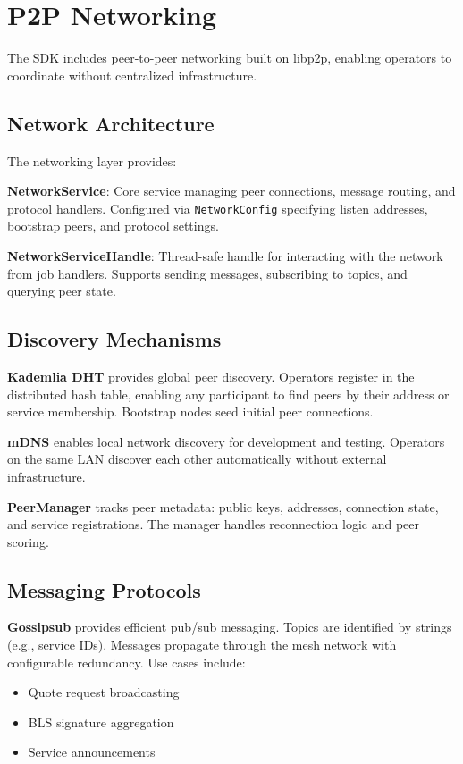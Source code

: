 \documentclass[11pt,a4paper]{article}
\begin{document}
\section{P2P Networking}

The SDK includes peer-to-peer networking built on libp2p, enabling operators to coordinate without centralized infrastructure.

\subsection{Network Architecture}

The networking layer provides:

\textbf{NetworkService}: Core service managing peer connections, message routing, and protocol handlers. Configured via \texttt{NetworkConfig} specifying listen addresses, bootstrap peers, and protocol settings.

\textbf{NetworkServiceHandle}: Thread-safe handle for interacting with the network from job handlers. Supports sending messages, subscribing to topics, and querying peer state.

\subsection{Discovery Mechanisms}

\textbf{Kademlia DHT} provides global peer discovery. Operators register in the distributed hash table, enabling any participant to find peers by their address or service membership. Bootstrap nodes seed initial peer connections.

\textbf{mDNS} enables local network discovery for development and testing. Operators on the same LAN discover each other automatically without external infrastructure.

\textbf{PeerManager} tracks peer metadata: public keys, addresses, connection state, and service registrations. The manager handles reconnection logic and peer scoring.

\subsection{Messaging Protocols}

\textbf{Gossipsub} provides efficient pub/sub messaging. Topics are identified by strings (e.g., service IDs). Messages propagate through the mesh network with configurable redundancy. Use cases include:
\begin{itemize}[noitemsep]
    \item Quote request broadcasting
    \item BLS signature aggregation
    \item Service announcements
\end{itemize}
\end{document}
